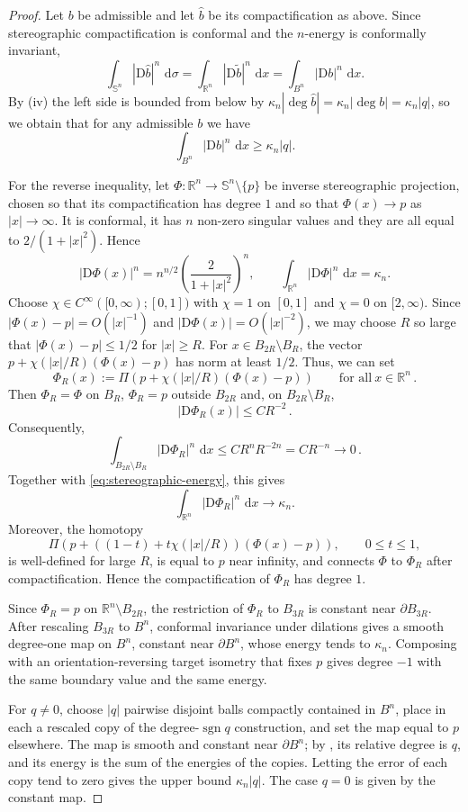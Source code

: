\documentclass[11pt,reqno]{amsart}
\numberwithin{equation}{section}
\newcommand{\Sph}{\mathbb S}
\newcommand{\R}{\mathbb R}
\newcommand{\D}{\mathrm D}
\newcommand{\dd}{\,\mathrm d}
\begin{document}
\begin{proof}
Let $b$ be admissible and let $\widehat b$ be its compactification as above. Since stereographic compactification is conformal and the $n$-energy is conformally invariant,
\[
  \int_{\Sph^n}|\D \widehat b|^n\,\dd\sigma
  =\int_{\R^n}|\D \widetilde b|^n\,\dd x
  =\int_{B^n}|\D b|^n\,\dd x .
\]
By (iv) the left side is bounded from below by $\kappa_n|\deg\widehat b|=\kappa_n|\deg b| = \kappa_n |q|$, so we obtain that for any admissible $b$ we have
\[
  \int_{B^n}|\D b|^n\,\dd x\ge \kappa_n|q|.
\]

For the reverse inequality, let $\Phi:\R^n\to\Sph^n\setminus\{p\}$ be inverse stereographic projection, chosen so that its compactification has degree $1$ and so that $\Phi(x)\to p$ as $|x|\to\infty$.  It is conformal, it has $n$ non-zero singular values and they are all equal to $2/(1+|x|^2)$. Hence
\begin{equation}\label{eq:stereographic-energy}
  |\D\Phi(x)|^n
  =n^{n/2}\left(\frac{2}{1+|x|^2}\right)^n,
  \qquad
  \int_{\R^n}|\D\Phi|^n\,\dd x=\kappa_n.
\end{equation}
Choose $\chi\in C^\infty([0,\infty);[0,1])$ with $\chi=1$ on $[0,1]$ and $\chi=0$ on $[2,\infty)$. Since $|\Phi(x)-p|=O(|x|^{-1})$ and $|\D\Phi(x)|=O(|x|^{-2})$, we may choose $R$ so large that $|\Phi(x)-p|\le1/2$ for $|x|\ge R$.  For $x\in B_{2R}\setminus B_R$, the vector $p+\chi(|x|/R)(\Phi(x)-p)$ has norm at least $1/2$. Thus, we can set
\[
  \Phi_R(x):=\Pi\!\left(p+\chi(|x|/R)(\Phi(x)-p)\right)
  \qquad\text{for all}\ x\in\R^n \,.
\]
Then $\Phi_R=\Phi$ on $B_R$, $\Phi_R=p$ outside $B_{2R}$ and, on $B_{2R}\setminus B_R$,
\[
  |\D\Phi_R(x)|\le CR^{-2} \,.
\]
Consequently,
\[
  \int_{B_{2R}\setminus B_R}|\D\Phi_R|^n\,\dd x
  \le CR^nR^{-2n}=CR^{-n}\to0 \,.
\]
Together with \eqref{eq:stereographic-energy}, this gives
\[
  \int_{\R^n}|\D\Phi_R|^n\,\dd x\to\kappa_n.
\]
Moreover, the homotopy
\[
  \Pi\!\left(p+((1-t)+t\chi(|x|/R))(\Phi(x)-p)\right),
  \qquad0\le t\le1,
\]
is well-defined for large $R$, is equal to $p$ near infinity, and connects $\Phi$ to $\Phi_R$ after compactification.  Hence the compactification of $\Phi_R$ has degree $1$.

Since $\Phi_R=p$ on $\R^n\setminus B_{2R}$, the restriction of $\Phi_R$ to $B_{3R}$ is constant near $\partial B_{3R}$.  After rescaling $B_{3R}$ to $B^n$, conformal invariance under dilations gives a smooth degree-one map on $B^n$, constant near $\partial B^n$, whose energy tends to $\kappa_n$.  Composing with an orientation-reversing target isometry that fixes $p$ gives degree $-1$ with the same boundary value and the same energy.

For $q\ne0$, choose $|q|$ pairwise disjoint balls compactly contained in $B^n$, place in each a rescaled copy of the degree-$\operatorname{sgn}q$ construction, and set the map equal to $p$ elsewhere.  The map is smooth and constant near $\partial B^n$; by , its relative degree is $q$, and its energy is the sum of the energies of the copies.  Letting the error of each copy tend to zero gives the upper bound $\kappa_n|q|$.  The case $q=0$ is given by the constant map.
\end{proof}
\end{document}
